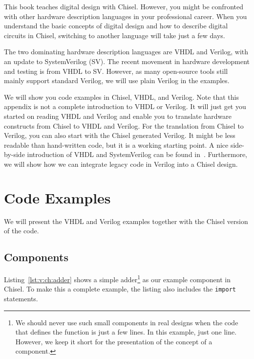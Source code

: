 \documentclass[%
    10pt,
    headinclude, footinclude=false,
    openright, %
    notitlepage,
    cleardoublepage=empty,
    headsepline,
    numbers=noenddot,
    bibliography=totoc, index=totoc,
    ]{scrbook}
\newcommand{\code}[1]{{\lstinline[basicstyle=\small\ttfamily]{#1}}}
\begin{document}

This book teaches digital design with Chisel.
However, you might be confronted with other hardware
description languages in your professional career.
When you understand the basic concepts of digital design
and how to describe digital circuits in Chisel,
switching to another language will take just a few days.

The two dominating hardware description languages are
VHDL and Verilog, with an update to SystemVerilog (SV).
The recent movement in hardware development and testing is from VHDL to SV.
However, as many open-source tools still mainly support standard Verilog,
we will use plain Verilog in the examples.

We will show you code examples in Chisel, VHDL, and Verilog.
Note that this appendix is not a complete introduction to VHDL or Verilog.
It will just get you started on reading VHDL and Verilog and
enable you to translate hardware constructs from Chisel to VHDL and Verilog.
For the translation from Chisel to Verilog, you can also start with the Chisel
generated Verilog. It might be less readable than hand-written code, but it is a working
starting point.
A nice side-by-side introduction of VHDL and SystemVerilog can be found in~\cite{harris2021digital}.
Furthermore, we will show how we can integrate legacy code in Verilog into a Chisel design.

\section{Code Examples}


We will present the VHDL and Verilog examples together with the Chisel version
of the code.

\subsection{Components}



Listing~\ref{lst:v:ch:adder} shows a simple adder\footnote{We should never use
such small components in real designs when the code that defines the function is just a few lines.
In this example, just one line. However, we keep it short for the presentation
of the concept of a component.}
as our example component in Chisel.
To make this a complete example, the listing also includes the \code{import} statements.
\end{document}
